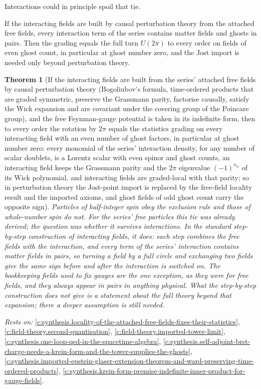 \documentclass[11pt]{article}
\newtheorem{theorem}{Theorem}[section]
\theoremstyle{definition}
\theoremstyle{plain}
\begin{document}
Interactions could in principle spoil that tie.

If the interacting fields are built by causal perturbation theory from the attached free fields, every interaction term of the series contains matter fields and ghosts in pairs. Then the grading equals the full turn $U(2\pi)$ to every order on fields of even ghost count, in particular at ghost number zero, and the Jost import is needed only beyond perturbation theory.

\begin{theorem}[If the interacting fields are built from the series' attached free fields by causal perturbation theory (Bogoliubov's formula, time-ordered products that are graded symmetric, preserve the Grassmann parity, factorise causally, satisfy the Wick expansion and are covariant under the covering group of the Poincare group), and the free Feynman-gauge potential is taken in its indefinite form, then to every order the rotation by $2\pi$ equals the statistics grading on every interacting field with an even number of ghost factors, in particular at ghost number zero: every monomial of the series' interaction density, for any number of scalar doublets, is a Lorentz scalar with even spinor and ghost counts, an interacting field keeps the Grassmann parity and the $2\pi$ eigenvalue $(-1)^{n_{\psi}}$ of its Wick polynomial, and interacting fields are graded-local with that parity; so in perturbation theory the Jost-point import is replaced by the free-field locality result and the imported axioms, and ghost fields of odd ghost count carry the opposite sign]\label{c:synthesis.interacting-fields-of-causal-perturbation-theory-keep-the-spin-statistics-connection-at-even-ghost-number}
Particles of half-integer spin obey the exclusion rule and those of whole-number spin do not. For the series' free particles this tie was already derived; the question was whether it survives interactions. In the standard step-by-step construction of interacting fields, it does: each step combines the free fields with the interaction, and every term of the series' interaction contains matter fields in pairs, so turning a field by a full circle and exchanging two fields give the same sign before and after the interaction is switched on. The bookkeeping fields used to fix gauges are the one exception, as they were for free fields, and they always appear in pairs in anything physical. What the step-by-step construction does not give is a statement about the full theory beyond that expansion; there a deeper assumption is still needed.
\end{theorem}
\noindent\emph{Rests on:} \ref{c:synthesis.locality-of-the-attached-free-fields-fixes-their-statistics}, \ref{c:field-theory.second-quantisation}, \ref{c:field-theory.imported-tower-limit}, \ref{c:synthesis.one-loop-qed-in-the-spacetime-algebra}, \ref{c:synthesis.self-adjoint-brst-charge-needs-a-krein-form-and-the-tower-supplies-the-ghosts}, \ref{c:synthesis.imported-epstein-glaser-extension-theorem-and-ward-preserving-time-ordered-products}, \ref{c:synthesis.krein-form-premise-indefinite-inner-product-for-gauge-fields}.
\end{document}
